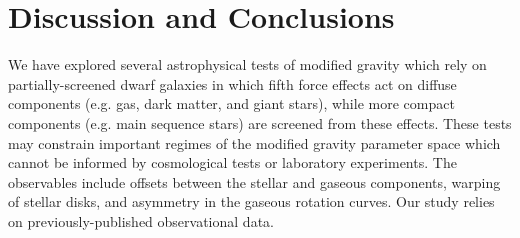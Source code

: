 \documentclass[useAMS,usenatbib,twocolumn]{mn2e}
\newcommand{\ha}{H$\alpha$}
\begin{document}





\section{Discussion and Conclusions}

\label{sec:discussion}
We have explored several astrophysical tests of modified gravity which rely on
partially-screened dwarf galaxies in which fifth force effects act on
diffuse components (e.g. gas, dark matter, and giant stars), while more
compact components (e.g. main sequence stars) are screened from these effects.
These tests may constrain important regimes of the modified gravity
parameter space which cannot be informed by cosmological tests or
laboratory experiments.  The observables include offsets between the stellar
and gaseous components, warping of stellar disks, and asymmetry in the
gaseous rotation curves. Our study relies on previously-published
observational data.
\end{document}
